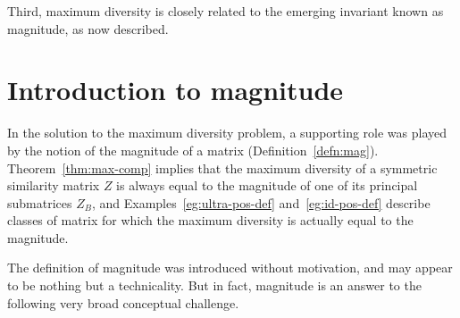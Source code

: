 Third, maximum diversity is closely related to the emerging invariant
known as magnitude, as now described.


\section{Introduction to magnitude}


In the solution to the maximum diversity problem, a supporting role was
played by the notion of the magnitude of a matrix
(Definition~\ref{defn:mag}).  Theorem~\ref{thm:max-comp} implies that the
maximum diversity of a symmetric similarity matrix $Z$ is always equal to
the magnitude of one of its principal submatrices $Z_B$, and
Examples~\ref{eg:ultra-pos-def} and~\ref{eg:id-pos-def} describe classes of
matrix for which the maximum diversity is actually equal to the magnitude.

The definition of magnitude was introduced without motivation, and may
appear to be nothing but a technicality.  But in fact, magnitude is
an answer to the following very broad conceptual challenge.

